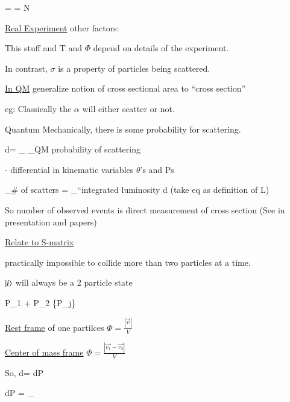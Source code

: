 {\be
\sigma =  =  N
\ee

\underline{Real Experiment}
other factors: 

This stuff and T and $\Phi$ depend on details of the experiment. 

In contrast, $\sigma$ is a property of particles being scattered. 

\underline{In QM} generalize notion of cross sectional area to ``cross section'' 

eg: Classically the $\alpha$ will either scatter or not. 

Quantum Mechanically,  there is some probability for scattering.

\be
d\sigma = _{} _{\textrm{QM probability of scattering}}
\ee

 - differential in kinematic variables $\theta$'s and Ps


\be
{}_{\# \textrm{of scatters}} = _{\textrm{``integrated luminosity}} \times d\sigma 
\ee
(take eq as definition of L)

So number of observed events is direct measurement of cross section (See in presentation and papers)


\underline{Relate to S-matrix}

practically impossible to collide more than two particles at a time.

$\ket{i}$ will always be a 2 particle state

\be
P_1 + P_2 \rightarrow \{P_j\}
\ee

\underline{Rest frame} of one partilces $\Phi = \frac{|\vec{v}|}{V}$

\underline{Center of mass frame}  $\Phi = \frac{|\vec{v_1} - \vec{v_2}|}{V}$


So, 
\be
d\sigma =  dP
\ee

\be
dP =  _{}
\ee

}
